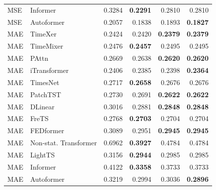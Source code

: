 \begin{longtable}{llrrrr}
MSE & Informer & 0.3284 & \textbf{0.2291} & 0.2810 & 0.2810 \\
MSE & Autoformer & 0.2057 & 0.1838 & 0.1893 & \textbf{0.1827} \\
\midrule
MAE & TimeXer & 0.2424 & 0.2420 & \textbf{0.2379} & \textbf{0.2379} \\
MAE & TimeMixer & 0.2476 & \textbf{0.2457} & 0.2495 & 0.2495 \\
MAE & PAttn & 0.2669 & 0.2638 & \textbf{0.2620} & \textbf{0.2620} \\
MAE & iTransformer & 0.2406 & 0.2385 & 0.2398 & \textbf{0.2364} \\
MAE & TimesNet & 0.2717 & \textbf{0.2658} & 0.2676 & 0.2676 \\
MAE & PatchTST & 0.2730 & 0.2691 & \textbf{0.2622} & \textbf{0.2622} \\
MAE & DLinear & 0.3016 & 0.2881 & \textbf{0.2848} & \textbf{0.2848} \\
MAE & FreTS & 0.2768 & \textbf{0.2703} & 0.2704 & 0.2704 \\
MAE & FEDformer & 0.3089 & 0.2951 & \textbf{0.2945} & \textbf{0.2945} \\
MAE & Non-stat. Transformer & 0.6962 & \textbf{0.3927} & 0.4784 & 0.4784 \\
MAE & LightTS & 0.3156 & \textbf{0.2944} & 0.2985 & 0.2985 \\
MAE & Informer & 0.4122 & \textbf{0.3358} & 0.3733 & 0.3733 \\
MAE & Autoformer & 0.3219 & 0.2994 & 0.3036 & \textbf{0.2896} \\
\end{longtable}
\endgroup

